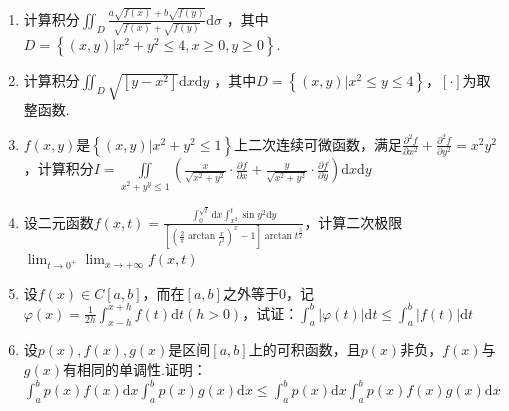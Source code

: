 \begin{enumerate}
	\item 计算积分$\iint_{D} \frac{a \sqrt{f(x)}+b \sqrt{f(y)}}{\sqrt{f(x)}+\sqrt{f(y)}} \mathrm{d}\sigma$ ，其中$D=\left\{(x, y) | x^{2}+y^{2} \leqslant 4, x \geqslant 0, y \geqslant 0\right\}$.
	\begin{solution}
	\end{solution}
	\item 计算积分$\iint_{D} \sqrt{\left[y-x^{2}\right]} \mathrm{d} x \mathrm{d} y$ ，其中$D=\left\{(x, y) | x^{2} \leqslant y \leqslant 4\right\}$，$[\cdot]$为取整函数.
	\begin{solution}
	\end{solution}
	\item $f(x,y)$是$\left\{(x, y) | x^{2}+y^{2} \leqslant 1\right\}$上二次连续可微函数，满足$\frac{\partial^{2} f}{\partial x^{2}}+\frac{\partial^{2} f}{\partial y^{2}}=x^{2} y^{2}$，计算积分$I=\iint\limits_{x^{2}+y^{y} \leqslant 1}\left(\frac{x}{\sqrt{x^{2}+y^{2}}} \cdot \frac{\partial f}{\partial x}+\frac{y}{\sqrt{x^{2}+y^{2}}} \cdot \frac{\partial f}{\partial y}\right) \mathrm{d} x \mathrm{d} y$
	\begin{solution}
	\end{solution}
	\item 设二元函数$f(x, t)=\frac{\int_{0}^{\sqrt{t}} \mathrm{d} x \int_{x^{2}}^{t} \sin y^{2} \mathrm{d} y}{\left[\left(\frac{2}{\pi} \arctan \frac{x}{t^{2}}\right)^{x}-1\right] \arctan t^{\frac{3}{2}}}$，计算二次极限$\lim _{t \rightarrow 0^{+}} \lim _{x \rightarrow+\infty} f(x, t)$
	\begin{solution}
	\end{solution}
	\item 设$f(x)\in C[a,b]$，而在$[a,b]$之外等于0，记$\varphi(x)=\frac{1}{2 h} \int_{x-h}^{x+h} f(t) \mathrm{d} t(h>0)$，试证：$\int_{a}^{b}|\varphi(t)| \mathrm{d} t \leqslant \int_{a}^{b}|f(t)| \mathrm{d} t$
	\begin{solution}
	\end{solution}
	
	\item 设$p(x),f(x),g(x)$是区间$[a,b]$上的可积函数，且$p(x)$非负，$f(x)$与$g(x)$有相同的单调性.证明：$\int_{a}^{b} p(x) f(x) \mathrm{d} x \int_{a}^{b} p(x) g(x) \mathrm{d} x \leqslant \int_{a}^{b} p(x) \mathrm{d} x \int_{a}^{b} p(x) f(x) g(x) \mathrm{d} x$
	\begin{solution}
	\end{solution}
	

\end{enumerate}
